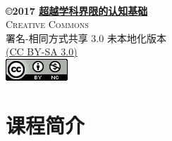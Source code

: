 \documentclass[11pt,fleqn]{book}
\makeatletter
\renewcommand{\cleardoublepage}{
	\clearpage\ifodd\c@page\else
	\hbox{}
	\vspace*{\fill}
	\thispagestyle{empty}
	\newpage
	\fi}
\numberwithin{dummy}{section}
\theoremstyle{ocrenumbox}
\theoremstyle{blacknumex}
\theoremstyle{blacknumbox}
\theoremstyle{ocrenum}
\newif\ifusechapterimage
\newcommand{\thechapterimage}{}%
\newcommand{\chapterimage}[1]{\ifusechapterimage\renewcommand{\thechapterimage}{#1}\fi}%
\makeatother
\begin{document}

\newpage
~\vfill

\begin{minipage}{0.65\textwidth}
	\begin{center}
	{\sffamily
		\textbf{\copyright 2017 \href{http://toyhouse.cc/wiki/index.php/Seven_Brief_Lessons_on_Physics}{\textbf{超越学科界限的认知基础}}}\\
		\textsc{Creative Commons}\\
		
		署名-相同方式共享 3.0 未本地化版本\\
		\href{https://creativecommons.org/licenses/by-sa/3.0/legalcode}{(CC BY-SA 3.0)}\\[12pt]
		\includegraphics{Pictures/license.png}\\[12pt]
	}
\end{center}
\end{minipage}\vspace*{1ex}




\chapterimage{chapter_head_1.pdf} %

\pagestyle{empty} %

\tableofcontents %

\cleardoublepage %

\pagestyle{fancy} %


\part{课程简介}
\end{document}
